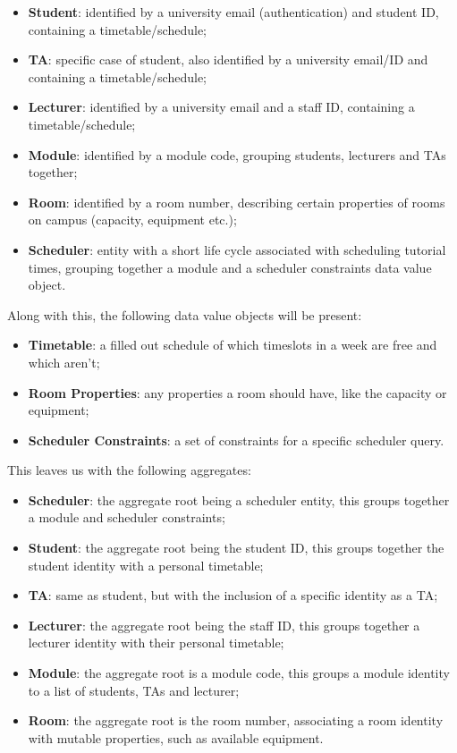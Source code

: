 \documentclass[12pt, a4paper]{article}
\begin{document}
\begin{itemize}
\item \textbf{Student}: identified by a university email (authentication) and student ID, containing a timetable/schedule;
\item \textbf{TA}: specific case of student, also identified by a university email/ID and containing a timetable/schedule;
\item \textbf{Lecturer}: identified by a university email and a staff ID, containing a timetable/schedule;
\item \textbf{Module}: identified by a module code, grouping students, lecturers and TAs together;
\item \textbf{Room}: identified by a room number, describing certain properties of rooms on campus (capacity, equipment etc.);
\item \textbf{Scheduler}: entity with a short life cycle associated with scheduling tutorial times, grouping together a module and a scheduler constraints data value object.
\end{itemize}

Along with this, the following data value objects will be present:

\begin{itemize}
\item \textbf{Timetable}: a filled out schedule of which timeslots in a week are free and which aren't;
\item \textbf{Room Properties}: any properties a room should have, like the capacity or equipment;
\item \textbf{Scheduler Constraints}: a set of constraints for a specific scheduler query.
\end{itemize}

This leaves us with the following aggregates:

\begin{itemize}
\item \textbf{Scheduler}: the aggregate root being a scheduler entity, this groups together a module and scheduler constraints;
\item \textbf{Student}: the aggregate root being the student ID, this groups together the student identity with a personal timetable;
\item \textbf{TA}: same as student, but with the inclusion of a specific identity as a TA;
\item \textbf{Lecturer}: the aggregate root being the staff ID, this groups together a lecturer identity with their personal timetable;
\item \textbf{Module}: the aggregate root is a module code, this groups a module identity to a list of students, TAs and lecturer;
\item \textbf{Room}: the aggregate root is the room number, associating a room identity with mutable properties, such as available equipment.
\end{itemize}
\end{document}
